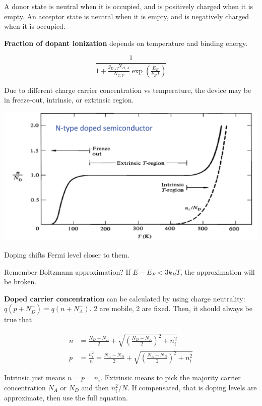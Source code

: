 \documentclass[a4paper,10pt]{article}
\begin{document}
\begin{multicols}{3}
A donor state is neutral when it is occupied, and is positively charged when it is empty. An acceptor state is neutral when it is empty, and is negatively charged when it is occupied.

\textbf{Fraction of dopant ionization} depends on temperature and binding energy.

$$\frac{1}{1+\frac{g_{D,A}N_{D,A}}{N_{C,V}}\exp(\frac{E_{B}}{k_{B}T})}$$

Due to different charge carrier concentration vs temperature, the device may be in freeze-out, intrinsic, or extrinsic region.

\begin{center}
    \includegraphics[width=\columnwidth]{../img/Pasted image 20241015105159.png}
\end{center}

Doping shifts Fermi level closer to them.

Remember Boltzmann approximation? If $E-E_{F} < 3k_{B}T$, the approximation will be broken.

\textbf{Doped carrier concentration} can be calculated by using charge neutrality: $q(p+N_{D}^{+}) = q(n+N_{A}^{-})$. 2 are mobile, 2 are fixed. Then, it should always be true that

\begin{small}
    \begin{align*}
        n &=  \frac{N_D - N_A}{2} + \sqrt{\left( \frac{N_D - N_A}{2} \right)^2 + n_i^2}\\
        p &=  \frac{n_i^2}{n} = \frac{N_A - N_D}{2} + \sqrt{\left( \frac{N_A - N_D}{2} \right)^2 + n_i^2}
    \end{align*}
\end{small}

Intrinsic just means $n=p=n_i$. Extrinsic means to pick the majority carrier concentration $N_A$ or $N_D$ and then $n_i^2/N$. If compensated, that is doping levels are approximate, then use the full equation.


\end{multicols}
\end{document}
